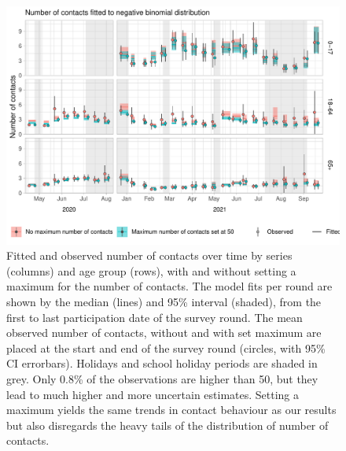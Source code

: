 \documentclass[fleqn,10pt]{wlscirep}
\begin{document}
\begin{figure}[ht]
\centering
\includegraphics[width=\linewidth]{../figures/fit_studypopulation_nb.pdf}
\caption{Fitted and observed number of contacts over time by series (columns) and age group (rows), with and without setting a maximum for the number of contacts. The model fits per round are shown by the median (lines) and 95\% interval (shaded), from the first to last participation date of the survey round. The mean observed number of contacts, without and with set maximum are placed at the start and end of the survey round (circles, with 95\% CI errorbars). Holidays and school holiday periods are shaded in grey. Only 0.8\% of the observations are higher than 50, but they lead to much higher and more uncertain estimates. Setting a maximum yields the same trends in contact behaviour as our results but also disregards the heavy tails of the distribution of number of contacts. }
\label{fig:nb}
\end{figure}
\end{document}
